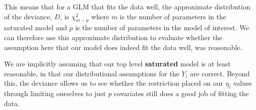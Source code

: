 \documentclass[
  a4paper,
  DIV=11,
  numbers=noendperiod]{scrreprt}
\newcommand{\term}[1]{\textbf{#1}}
\begin{document}
This means that for a GLM that fits the data well, the approximate
distribution of the deviance, \(D\), is \(\chi^2_{m-p}\) where \(m\) is
the number of parameters in the saturated model and \(p\) is the number
of parameters in the model of interest. We can therefore use this
approximate distribution to evaluate whether the assumption here that
our model does indeed fit the data well, was reasonable.

We are implicitly assuming that our top level \term{saturated} model is
at least reasonable, in that our distributional assumptions for the
\(Y_i\) are correct. Beyond this, the deviance allows us to see whether
the restriction placed on our \(\eta_i\) values through limiting
ourselves to just \(p\) covariates still does a good job of fitting the
data.

\label{deviance-for-a-binomial-model}
\end{document}
